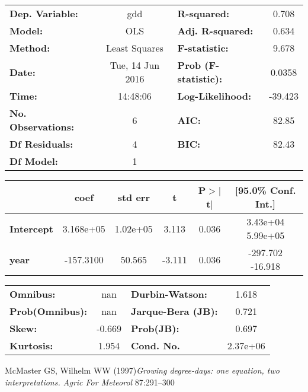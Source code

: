 \documentclass[12pt]{article}
\begin{document}
\begin{center}
\begin{tabular}{lclc}
\toprule
\textbf{Dep. Variable:}    &       gdd        & \textbf{  R-squared:         } &     0.708   \\
\textbf{Model:}            &       OLS        & \textbf{  Adj. R-squared:    } &     0.634   \\
\textbf{Method:}           &  Least Squares   & \textbf{  F-statistic:       } &     9.678   \\
\textbf{Date:}             & Tue, 14 Jun 2016 & \textbf{  Prob (F-statistic):} &   0.0358    \\
\textbf{Time:}             &     14:48:06     & \textbf{  Log-Likelihood:    } &   -39.423   \\
\textbf{No. Observations:} &           6      & \textbf{  AIC:               } &     82.85   \\
\textbf{Df Residuals:}     &           4      & \textbf{  BIC:               } &     82.43   \\
\textbf{Df Model:}         &           1      & \textbf{                     } &             \\
\bottomrule
\end{tabular}
\begin{tabular}{lccccc}
                   & \textbf{coef} & \textbf{std err} & \textbf{t} & \textbf{P$>$$|$t$|$} & \textbf{[95.0\% Conf. Int.]}  \\
\midrule
\textbf{Intercept} &    3.168e+05  &     1.02e+05     &     3.113  &         0.036        &      3.43e+04  5.99e+05       \\
\textbf{year}      &    -157.3100  &       50.565     &    -3.111  &         0.036        &      -297.702   -16.918       \\
\bottomrule
\end{tabular}
\begin{tabular}{lclc}
\textbf{Omnibus:}       &    nan & \textbf{  Durbin-Watson:     } &    1.618  \\
\textbf{Prob(Omnibus):} &    nan & \textbf{  Jarque-Bera (JB):  } &    0.721  \\
\textbf{Skew:}          & -0.669 & \textbf{  Prob(JB):          } &    0.697  \\
\textbf{Kurtosis:}      &  1.954 & \textbf{  Cond. No.          } & 2.37e+06  \\
\bottomrule
\end{tabular}
\end{center}








\begin{thebibliography}{99}

McMaster GS, Wilhelm WW (1997){\em Growing degree-days: one equation, two interpretations. Agric For Meteorol} 87:291–300




\end{thebibliography}
\end{document}
